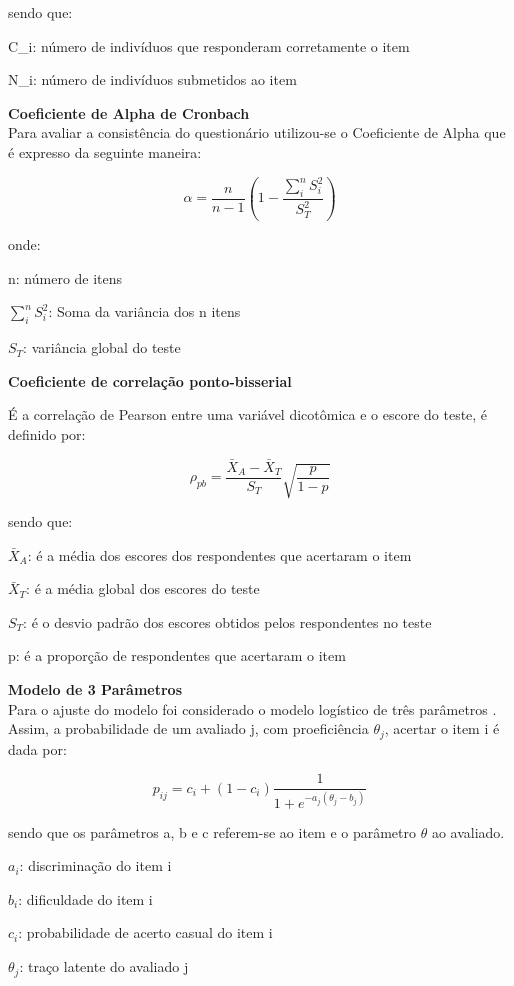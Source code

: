 \documentclass[]{article}
\begin{document}
sendo que:

C\_i: número de indivíduos que responderam corretamente o item

N\_i: número de indivíduos submetidos ao item

\textbf{Coeficiente de Alpha de Cronbach}\\

Para avaliar a consistência do questionário utilizou-se o Coeficiente de
Alpha que é expresso da seguinte maneira:

\[\alpha = \frac{n}{n-1}(1 - \frac{\sum_i^nS_i^2}{S_T^2})\]

onde:

n: número de itens

\(\sum_i^n S_i^2\): Soma da variância dos n itens

\(S_T\): variância global do teste

\textbf{Coeficiente de correlação ponto-bisserial}

É a correlação de Pearson entre uma variável dicotômica e o escore do
teste, é definido por:

\[\rho_{pb} = \frac{\bar{X}_A - \bar{X}_T}{S_T}\sqrt{\frac{p}{1-p}}\]

sendo que:

\(\bar{X}_A\): é a média dos escores dos respondentes que acertaram o
item

\(\bar{X}_T\): é a média global dos escores do teste

\(S_T\): é o desvio padrão dos escores obtidos pelos respondentes no
teste

p: é a proporção de respondentes que acertaram o item

\textbf{Modelo de 3 Parâmetros}\\

Para o ajuste do modelo foi considerado o modelo logístico de três
parâmetros \citet{tri}. Assim, a probabilidade de um avaliado j, com
proeficiência \(\theta_j\), acertar o item i é dada por:

\[p_{ij} = c_i + (1 - c_i) \frac{1}{1 + e^{-a_j(\theta_j - b_j)}}\]

sendo que os parâmetros a, b e c referem-se ao item e o parâmetro
\(\theta\) ao avaliado.

\(a_i\): discriminação do item i

\(b_i\): dificuldade do item i

\(c_i\): probabilidade de acerto casual do item i

\(\theta_j\): traço latente do avaliado j
\end{document}
